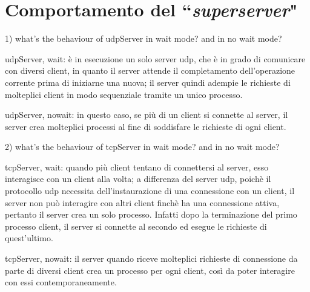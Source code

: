 \documentclass[a4paper, 12pt]{report}
\begin{document}
\section{Comportamento del ``\textit{superserver}"}

1) what's the behaviour of udpServer in wait mode? and in no wait mode?
		
			udpServer, wait: è in esecuzione un solo server udp, che è in grado di
			comunicare con diversi client, in quanto il server attende il completamento
			dell'operazione corrente prima di iniziarne una nuova; il server quindi
			adempie le richieste di molteplici client in modo sequenziale tramite
			un unico processo.
			
			udpServer, nowait: in questo caso, se più di un client si connette al server,
			il server crea molteplici processi al fine di soddisfare le richieste
			di ogni client.
			
		2) what's the behaviour of tcpServer in wait mode? and in no wait mode?
			
			tcpServer, wait: quando più client tentano di connettersi al server, esso
			interagisce con un client alla volta; a differenza del server udp,
			poichè il protocollo udp necessita dell'instaurazione di una connessione
			con un client, il server non può interagire con altri client finchè ha una
			connessione attiva, pertanto il server crea un solo processo.
			Infatti dopo la terminazione del primo processo client, il server si connette
			al secondo ed esegue le richieste di quest'ultimo.
		
			tcpServer, nowait: il server quando riceve molteplici richieste di connessione da
			parte di diversi client crea un processo per ogni client, così da poter
			interagire con essi contemporaneamente.
\end{document}

